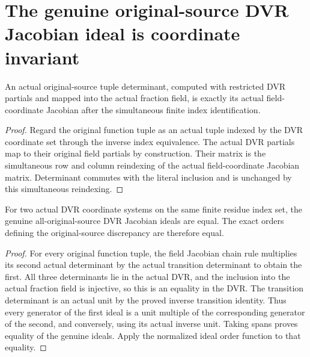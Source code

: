 \section{The genuine original-source DVR Jacobian ideal is coordinate invariant}

\begin{lemma}\label{lem:sc0-original-dvr-tuple-field-jacobian}
\leanok
{}
An actual original-source tuple determinant, computed with restricted DVR
partials and mapped into the actual fraction field, is exactly its actual
field-coordinate Jacobian after the simultaneous finite index identification.
\end{lemma}
\begin{proof}
Regard the original function tuple as an actual tuple indexed by the DVR
coordinate set through the inverse index equivalence. The actual DVR partials
map to their original field partials by construction. Their matrix is the
simultaneous row and column reindexing of the actual field-coordinate
Jacobian matrix. Determinant commutes with the literal inclusion and is
unchanged by this simultaneous reindexing.
\end{proof}

\begin{theorem}\label{thm:sc0-original-dvr-jacobian-ideal-coordinate-independent}
\leanok
{}
For two actual DVR coordinate systems on the same finite residue index set,
the genuine all-original-source DVR Jacobian ideals are equal. The exact
orders defining the original-source discrepancy are therefore equal.
\end{theorem}
\begin{proof}
For every original function tuple, the field Jacobian chain rule multiplies
its second actual determinant by the actual transition determinant to obtain
the first. All three determinants lie in the actual DVR, and the inclusion
into the actual fraction field is injective, so this is an equality in the
DVR. The transition determinant is an actual unit by the proved inverse
transition identity. Thus every generator of the first ideal is a unit
multiple of the corresponding generator of the second, and conversely,
using its actual inverse unit. Taking spans proves equality of the genuine
ideals. Apply the normalized ideal order function to that equality.
\end{proof}
